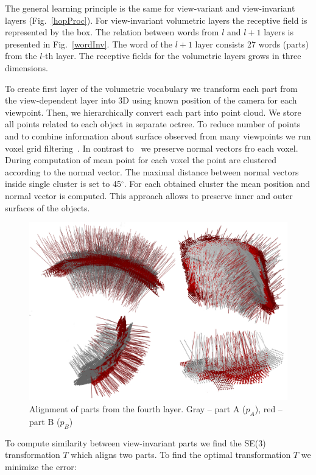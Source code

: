 \documentclass[letterpaper,10pt,conference]{ieeeconf}  %
\begin{document}
The general learning principle is the same for view-variant and view-invariant layers (Fig.~\ref{hopProc}). For view-invariant volumetric layers the receptive field is represented by the box. The relation between words from $l$ and $l+1$ layers is presented in Fig.~\ref{wordInv}. The word of the $l+1$ layer consists 27 words (parts) from the $l$-th layer. The receptive fields for the volumetric layers grows in three dimensions.

To create first layer of the volumetric vocabulary we transform each part from the view-dependent layer into 3D using known position of the camera for each viewpoint. Then, we hierarchically convert each part into point cloud. We store all points related to each object in separate octree. To reduce number of points and to combine information about surface observed from many viewpoints we run voxel grid filtering~\cite{Aldoma2012}. In contrast to~\cite{Aldoma2012} we preserve normal vectors fro each voxel. During computation of mean point for each voxel the point are clustered according to the normal vector. The maximal distance between normal vectors inside single cluster is set to 45$^\circ$. For each obtained cluster the mean position and normal vector is computed. This approach allows to preserve inner and outer surfaces of the objects.

\begin{figure}[t]
 \centering
\includegraphics[width=0.95\columnwidth]{images/viParts.eps}
\caption{Alignment of parts from the fourth layer. Gray -- part A ($p_A$), red -- part B ($p_B$)}
 \label{viParts}
\end{figure}

To compute similarity between view-invariant parts we find the SE(3) transformation $T$ which aligns two parts. To find the optimal transformation $T$ we minimize the error:
\end{document}
